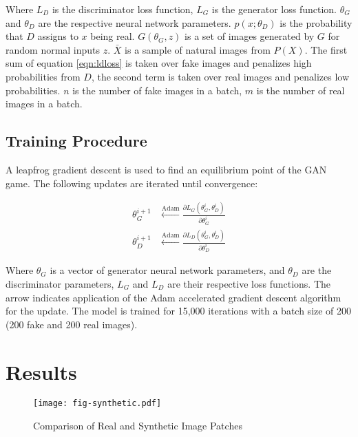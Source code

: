 \documentclass[a4paper,12pt]{spieman}  %
\begin{document}
\begin{spacing}{1}
	\noindent Where $L_D$ is the discriminator loss function, $L_G$ is the
	generator loss function. $\theta_G$ and $\theta_D$ are the respective
	neural network parameters. $p(x; \theta_D)$ is the probability that $D$
	assigns to $x$ being real.  $G(\theta_G,z)$ is a set of images
	generated by $G$ for random normal inputs $z$. $\bar{X}$ is a sample of
	natural images from $P(X)$. The first sum of equation \ref{eqn:ldloss}
	is taken over fake images and penalizes high probabilities from $D$, the
	second term is taken over real images and penalizes low probabilities.
	$n$ is the number of fake images in a batch, $m$ is the number of real
	images in a batch.


\subsection{Training Procedure}

	A leapfrog gradient descent is used to find an equilibrium point of the
	GAN game. The following updates are iterated until convergence:

	\begin{align}
		\theta_G^{i+1} &\xleftarrow{\text{Adam}}
		\frac{\partial L_G(\theta_G^i, \theta_D^i)}
		     {\partial \theta_G^i}
		\\
		\theta_D^{i+1} &\xleftarrow{\text{Adam}}
		\frac{\partial L_D(\theta_G^i, \theta_D^i)}
		     {\partial \theta_D^i}
	\end{align}

	\noindent Where $\theta_G$ is a vector of generator neural network
	parameters, and $\theta_D$ are the discriminator parameters, $L_G$ and
	$L_D$ are their respective loss functions. The arrow indicates
	application of the Adam accelerated gradient descent algorithm for the
	update\cite{DBLP:journals/corr/KingmaB14}. The model is trained for
	15,000 iterations with a batch size of 200 (200 fake and 200 real
	images).


\section{Results}

\begin{figure}
\begin{center}
  \texttt{[image: fig-synthetic.pdf]}
\end{center}
\caption{Comparison of Real and Synthetic Image Patches}
\label{fig:synthetic}
\end{figure}


\end{spacing}
\end{document}
